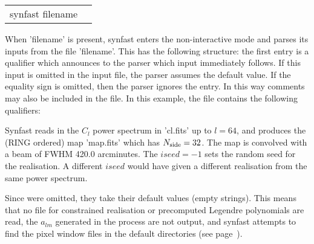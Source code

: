 \begin{examples}{2}
{
\begin{tabular}{ll} %
synfast  filename \\
\end{tabular}
}
{When 'filename' is present, synfast enters the non-interactive mode and parses
its inputs from the file 'filename'. This has the following
structure: the first entry is a qualifier which announces to the parser
which input immediately follows. If this input is omitted in the
input file, the parser assumes the default value.
If the equality sign is omitted, then the parser ignores the entry.
In this way comments may also be included in the file.
In this example, the file contains the following qualifiers:\hfill\newline
{}

Synfast reads in the $C_l$ power spectrum in 'cl.fits' up to $l=64$, and
produces the (RING ordered) map
'map.fits' which has $N_{\rm side}=32$.
The map is convolved with a beam of FWHM 420.0 arcminutes. The $iseed=-1$ sets
the random seed for the realisation. A different $iseed$ would have given a different 
realisation from the same power spectrum.

Since \hfill\newline
{}
were omitted, they take their default values (empty strings). 
This means that no file for constrained realisation or precomputed
Legendre polynomials are read, the $a_{lm}$ generated in the process are not
output, and synfast attempts to find the pixel
window files in the default directories (see page~\pageref{page:defdir}).
}
\end{examples}

